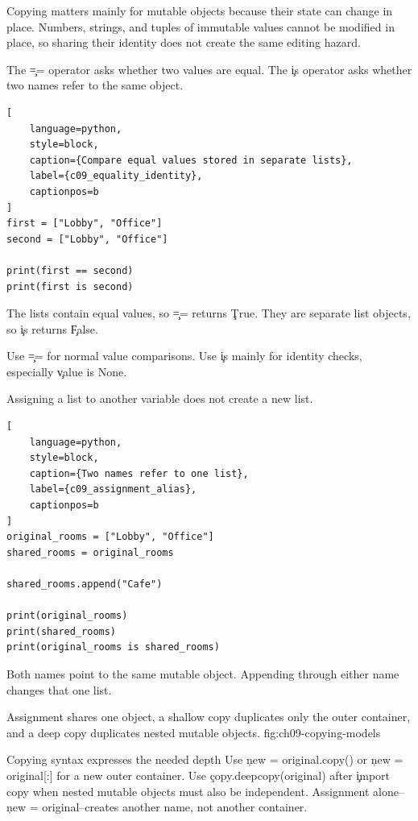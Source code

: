 Copying matters mainly for mutable objects because their state can change in
place. Numbers, strings, and tuples of immutable values cannot be modified in
place, so sharing their identity does not create the same editing hazard.


The \c{==} operator asks whether two values are equal. The \c{is} operator asks
whether two names refer to the same object.

\begin{lstlisting}[
    language=python,
    style=block,
    caption={Compare equal values stored in separate lists},
    label={c09_equality_identity},
    captionpos=b
]
first = ["Lobby", "Office"]
second = ["Lobby", "Office"]

print(first == second)
print(first is second)
\end{lstlisting}

The lists contain equal values, so \c{==} returns \c{True}. They are separate
list objects, so \c{is} returns \c{False}.

Use \c{==} for normal value comparisons. Use \c{is} mainly for identity checks,
especially \c{value is None}.


Assigning a list to another variable does not create a new list.

\begin{lstlisting}[
    language=python,
    style=block,
    caption={Two names refer to one list},
    label={c09_assignment_alias},
    captionpos=b
]
original_rooms = ["Lobby", "Office"]
shared_rooms = original_rooms

shared_rooms.append("Cafe")

print(original_rooms)
print(shared_rooms)
print(original_rooms is shared_rooms)
\end{lstlisting}

Both names point to the same mutable object. Appending through either name
changes that one list.

{Assignment shares one object, a shallow copy duplicates only the outer container, and a deep copy duplicates nested mutable objects.}
{fig:ch09-copying-models}

\begin{SyntaxBox}{Copying syntax expresses the needed depth}
Use \c{new = original.copy()} or \c{new = original[:]} for a new outer
container. Use \c{copy.deepcopy(original)} after \c{import copy} when nested
mutable objects must also be independent. Assignment alone--
\c{new = original}--creates another name, not another container.
\end{SyntaxBox}

